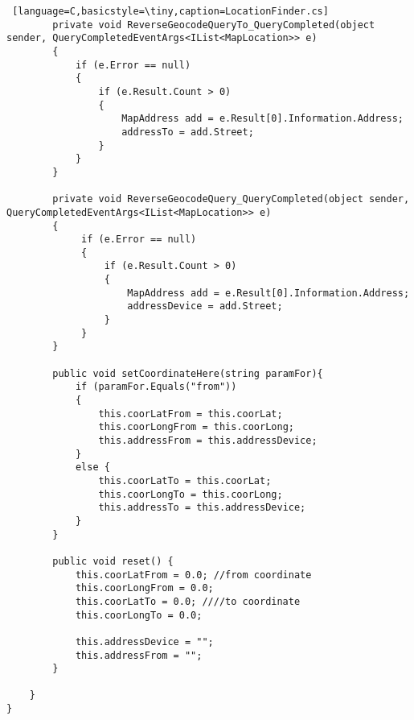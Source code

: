\begin{lstlisting} [language=C,basicstyle=\tiny,caption=LocationFinder.cs]
        private void ReverseGeocodeQueryTo_QueryCompleted(object sender, QueryCompletedEventArgs<IList<MapLocation>> e)
        {
            if (e.Error == null)
            {
                if (e.Result.Count > 0)
                {
                    MapAddress add = e.Result[0].Information.Address;
                    addressTo = add.Street;
                }
            }
        }

        private void ReverseGeocodeQuery_QueryCompleted(object sender, QueryCompletedEventArgs<IList<MapLocation>> e)
        {
             if (e.Error == null)
             {
                 if (e.Result.Count > 0)
                 {
                     MapAddress add = e.Result[0].Information.Address;
                     addressDevice = add.Street;
                 } 
             }
        } 

        public void setCoordinateHere(string paramFor){
            if (paramFor.Equals("from"))
            {
                this.coorLatFrom = this.coorLat;
                this.coorLongFrom = this.coorLong;
                this.addressFrom = this.addressDevice;
            }
            else {
                this.coorLatTo = this.coorLat;
                this.coorLongTo = this.coorLong;
                this.addressTo = this.addressDevice;
            }
        }

        public void reset() { 
            this.coorLatFrom = 0.0; //from coordinate
            this.coorLongFrom = 0.0;
            this.coorLatTo = 0.0; ////to coordinate
            this.coorLongTo = 0.0;

            this.addressDevice = "";
            this.addressFrom = "";
        }
 
    }
}
\end{lstlisting}